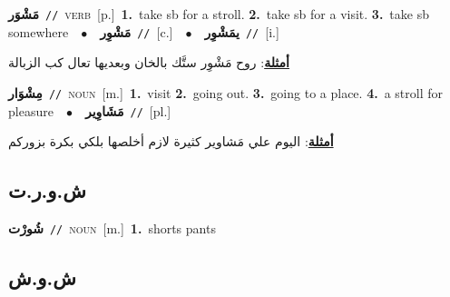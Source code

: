\documentclass[10pt,a4paper,twoside]{article} %
\begin{document}
\begin{multicols}{2}
{\setlength\topsep{0pt}\textbf{\foreignlanguage{arabic}{مَشْوَر}}\ {\color{gray}\texttt{//}\color{black}}\ \textsc{verb}\ [p.]\ \textbf{1.}~take sb for a stroll.  \textbf{2.}~take sb for a visit.  \textbf{3.}~take sb somewhere\ \ $\bullet$\ \ \setlength\topsep{0pt}\textbf{\foreignlanguage{arabic}{مَشْوِر}}\ {\color{gray}\texttt{//}\color{black}}\ [c.]\ \ $\bullet$\ \ \setlength\topsep{0pt}\textbf{\foreignlanguage{arabic}{يمَشْوِر}}\ {\color{gray}\texttt{//}\color{black}}\ [i.]\  \begin{flushright}\color{gray}\foreignlanguage{arabic}{\textbf{\underline{\foreignlanguage{arabic}{أمثلة}}}: روح مَشْوِر ستَّك بالخان وبعديها تعال كب الزبالة}\end{flushright}\color{black}} \vspace{2mm}

{\setlength\topsep{0pt}\textbf{\foreignlanguage{arabic}{مِشْوَار}}\ {\color{gray}\texttt{//}\color{black}}\ \textsc{noun}\ [m.]\ \textbf{1.}~visit  \textbf{2.}~going out.  \textbf{3.}~going to a place.  \textbf{4.}~a stroll for pleasure\ \ $\bullet$\ \ \setlength\topsep{0pt}\textbf{\foreignlanguage{arabic}{مَشَاوِير}}\ {\color{gray}\texttt{//}\color{black}}\ [pl.]\  \begin{flushright}\color{gray}\foreignlanguage{arabic}{\textbf{\underline{\foreignlanguage{arabic}{أمثلة}}}: اليوم علي مَشاوير كثيرة لازم أخلصها بلكي بكرة بزوركم}\end{flushright}\color{black}} \vspace{2mm}

\vspace{-3mm}
\subsection*{\color{blue}\foreignlanguage{arabic}{ش.و.ر.ت}\color{blue}{ (ntws)}} 

{\setlength\topsep{0pt}\textbf{\foreignlanguage{arabic}{شُورْت}}\ {\color{gray}\texttt{//}\color{black}}\ \textsc{noun}\ [m.]\ \textbf{1.}~shorts pants\ } \vspace{2mm}

\vspace{-3mm}
\subsection*{\color{blue}\foreignlanguage{arabic}{ش.و.ش}\color{blue}{}} 


\end{multicols}
\end{document}
